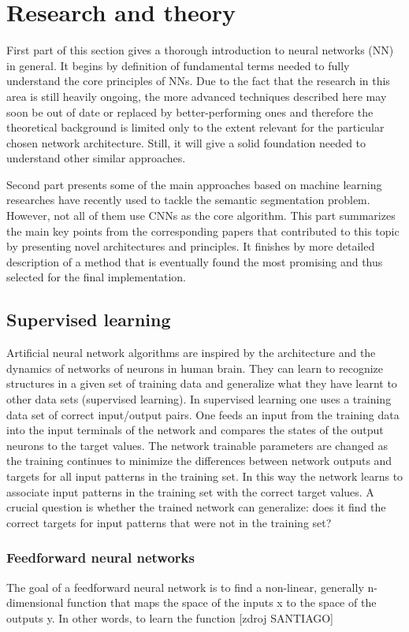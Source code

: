\chapter{Research and theory}
\label{research}
First part of this section gives a thorough introduction to neural networks (NN) in general. It begins by definition of fundamental terms needed to fully understand the core principles of NNs. Due to the fact that the research in this area is still heavily ongoing, the more advanced techniques described here may soon be out of date or replaced by better-performing ones and therefore the theoretical background is limited only to the extent relevant for the particular chosen network architecture. Still, it will give a solid foundation needed to understand other similar approaches. 

Second part presents some of the main approaches based on machine learning researches have recently used to tackle the semantic segmentation problem. However, not all of them use CNNs as the core algorithm. This part summarizes the main key points from the corresponding papers that contributed to this topic by presenting novel architectures and principles. It finishes by more detailed description of a method that is eventually found the most promising and thus selected for the final implementation.

\section{Supervised learning}
Artificial neural network algorithms are inspired by the architecture and the dynamics
of networks of neurons in human brain. They can learn to recognize structures in a given set of training data and generalize what they have learnt to other data sets (supervised learning). In supervised learning one uses a training data set of correct input/output pairs. One feeds an input from the training data into the input terminals of the network and compares the states of the output neurons to the target values. The network trainable parameters are changed as the training continues to minimize the differences between network outputs and targets for all input patterns in the training set. In this way the network learns to associate input patterns in the training set with the correct target values. A crucial question is whether the trained network can generalize: does it find the correct targets for input patterns that were not in the training set? 

\subsection{Feedforward neural networks}
The goal of a feedforward neural network is to find a non-linear, generally n-dimensional function that maps the space of the inputs x to the space of the outputs y. In other words, to learn the function [zdroj SANTIAGO]

